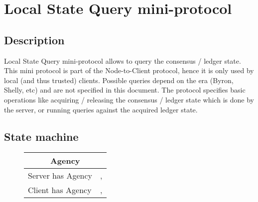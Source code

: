 \section{Local State Query mini-protocol}
\label{local-state-query-protocol}
\newcommand{\StAcquiring}{\state{Acquiring}}
\newcommand{\StAcquired}{\state{Acquired}}
\newcommand{\StQuerying}{\state{Querying}}
\newcommand{\MsgAcquire}{\trans{MsgAcquire}}
\newcommand{\MsgAcquired}{\trans{MsgAcquired}}
\newcommand{\MsgFailure}{\trans{MsgFailure}}
\newcommand{\MsgQuery}{\trans{MsgQuery}}
\newcommand{\MsgResult}{\trans{MsgResult}}
\newcommand{\MsgRelease}{\trans{MsgRelease}}
\newcommand{\MsgReAcquire}{\trans{MsgReAcquire}}

\subsection{Description}
Local State Query mini-protocol allows to query the consensus / ledger state.
This mini protocol is part of the Node-to-Client protocol, hence it is only
used by local (and thus trusted) clients.  Possible queries depend on the era
(Byron, Shelly, etc) and are not specified in this document.  The protocol
specifies basic operations like acquiring / releasing the consensus / ledger
state which is done by the server, or running queries against the acquired
ledger state.

\subsection{State machine}
\begin{figure}[h]
  \begin{tabular}{|l|l|}
    \hline
    \multicolumn{2}{|c|}{Agency} \\ \hline
    Server has Agency & \StIdle{}, \StAcquired{} \\ \hline
    Client has Agency & \StAcquiring{}, \StQuerying{} \\ \hline
  \end{tabular}
\end{figure}

